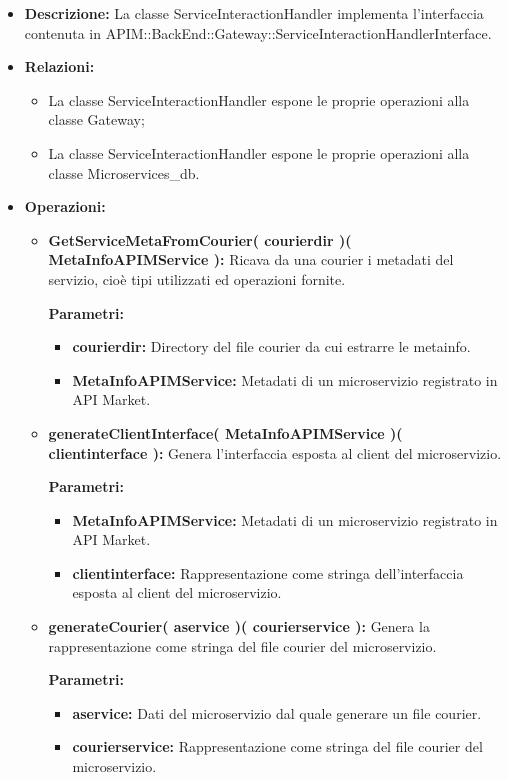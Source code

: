 \begin{itemize}
	\item \textbf{Descrizione:} La classe ServiceInteractionHandler implementa l'interfaccia contenuta in APIM::BackEnd::Gateway::ServiceInteractionHandlerInterface.
	\item \textbf{Relazioni:}
		\begin{itemize}
			\item La classe ServiceInteractionHandler espone le proprie operazioni alla classe Gateway;
			\item La classe ServiceInteractionHandler espone le proprie operazioni alla classe Microservices\_db.
		\end{itemize}
	\item \textbf{Operazioni:}
		\begin{itemize}
			\item \textbf{GetServiceMetaFromCourier( courierdir )( MetaInfoAPIMService ):} Ricava da una courier i metadati del servizio, cioè tipi utilizzati ed operazioni fornite.
				\begin{description}
    				\item[\textbf{Parametri:}]
				\end{description}
				\begin{itemize}
					\item \textbf{courierdir:} Directory del file courier da cui estrarre le metainfo.
					\item \textbf{MetaInfoAPIMService:} Metadati di un microservizio registrato in API Market.
				\end{itemize}
			\item \textbf{generateClientInterface( MetaInfoAPIMService )( clientinterface ):} Genera l'interfaccia esposta al client del microservizio.
				\begin{description}
    				\item[\textbf{Parametri:}]
				\end{description}
				\begin{itemize}
					\item \textbf{MetaInfoAPIMService:} Metadati di un microservizio registrato in API Market.
					\item \textbf{clientinterface:} Rappresentazione come stringa dell'interfaccia esposta al client del microservizio.
				\end{itemize}
			\item \textbf{generateCourier( aservice )( courierservice ):} Genera la rappresentazione come stringa del file courier del microservizio.
				\begin{description}
    				\item[\textbf{Parametri:}]
				\end{description}
				\begin{itemize}
					\item \textbf{aservice:} Dati del microservizio dal quale generare un file courier.
					\item \textbf{courierservice:} Rappresentazione come stringa del file courier del microservizio.
				\end{itemize}
		\end{itemize}
\end{itemize}


